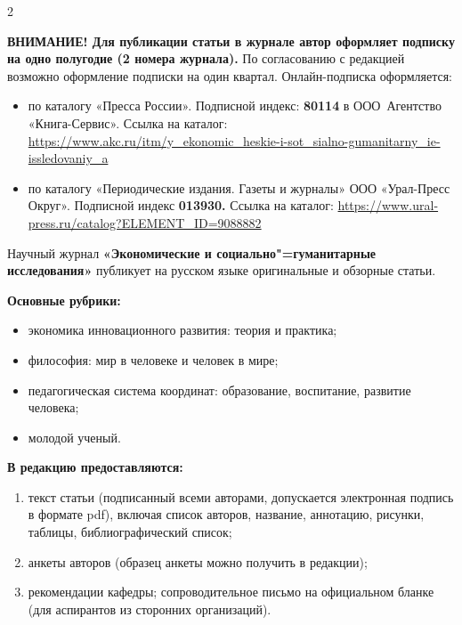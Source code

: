 \begin{multicols}{2}


\textbf{ВНИМАНИЕ! Для публикации статьи в журнале автор оформляет
подписку на одно полугодие (2 номера журнала).} По согласованию с
редакцией возможно оформление подписки на один квартал. Онлайн-подписка
оформляется:
\begin{itemize}
\item по каталогу «Пресса России». Подписной индекс: \textbf{80114} в ООО~Агентство «Книга-Сервис». Ссылка на каталог:\\
\href{https://www.akc.ru/itm/y_ekonomic_heskie-i-sot_sialno-gumanitarny_ie-issledovaniy_a}{https://www.akc.ru/itm/y\_ekonomic\_heskie-i-sot\_sialno-gumanitarny\_ie-issledovaniy\_a}

\item по каталогу «Периодические издания. Газеты и журналы» ООО «Урал-Пресс
Округ». Подписной индекс \textbf{013930.} Ссылка на каталог:
\url{https://www.ural-press.ru/catalog?ELEMENT_ID=9088882}
\end{itemize}

Научный журнал \textbf{«Экономические и социально"=гуманитарные
исследования»} публикует на русском языке оригинальные и обзорные
статьи.

\textbf{Основные рубрики:}
\begin{itemize}
\item экономика инновационного развития: теория и практика;

\item  философия: мир в человеке и человек в мире;

\item  педагогическая система координат: образование, воспитание, развитие
человека;

\item  молодой ученый.
\end{itemize}

\textbf{В редакцию предоставляются:}
\begin{enumerate}[label={\arabic*)}]
\item  текст статьи (подписанный всеми авторами, допускается электронная
подпись в формате pdf), включая список авторов, название, аннотацию,
рисунки, таблицы, библиографический список;

\item  анкеты авторов (образец анкеты можно получить в редакции);

\item  рекомендации кафедры; сопроводительное письмо на официальном бланке
(для аспирантов из сторонних организаций).
\end{enumerate}


\end{multicols}
